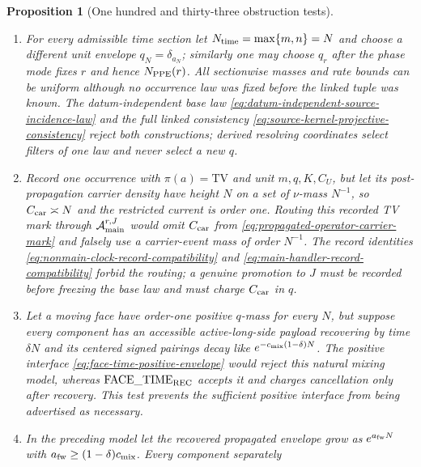 \documentclass[11pt]{article}
\newtheorem{proposition}[theorem]{Proposition}
\begin{document}
\begin{proposition}[One hundred and thirty-three obstruction tests]
\begin{enumerate}[label=\textup{(T\arabic*)}]
      upper moments do not prevent the normalized likelihood
      $W_\eta/\int W_\eta dK_\eta$ from having divergent $L^p$ norm.  The
      parentwise lower bound
      \eqref{eq:kernelwise-weight-normalization}, which is independent of the
      global tree normalization, rejects this rare-parent countermodel.
\item For every admissible time section let
      $N_{\rm time}=\max\{m,n\}=N$ and choose a different unit envelope
      $q_N=\delta_{a_N}$; similarly one may choose $q_r$ after the phase mode
      fixes $r$ and hence $N_{\rm PPE}(r)$.  All sectionwise masses and rate
      bounds can be uniform although no occurrence law was fixed before the
      linked tuple was known.  The datum-independent base law
      \eqref{eq:datum-independent-source-incidence-law} and the full linked
      consistency \eqref{eq:source-kernel-projective-consistency} reject
      both constructions; derived resolving coordinates select filters of
      one law and never select a new $q$.
\item Record one occurrence with $\pi(a)=\mathrm{TV}$ and unit
      $m,q,K,C_U$, but let its post-propagation carrier density have height
      $N$ on a set of $\nu$-mass $N^{-1}$, so $C_{\rm car}\asymp N$ and the
      restricted current is order one.  Routing this recorded TV mark through
      $\mathcal A_{\rm main}^{r,J}$ would omit $C_{\rm car}$ from
      \eqref{eq:propagated-operator-carrier-mark} and falsely use a
      carrier-event mass of order $N^{-1}$.  The record identities
      \eqref{eq:nonmain-clock-record-compatibility} and
      \eqref{eq:main-handler-record-compatibility} forbid the routing; a
      genuine promotion to $J$ must be recorded before freezing the base law
      and must charge $C_{\rm car}$ in $q$.
\item Let a moving face have order-one positive $q$-mass for every $N$, but
      suppose every component has an accessible active-long-side payload
      recovering by time $\delta N$ and its
      centered signed pairings decay like
      $e^{-c_{\rm mix}(1-\delta)N}$.  The positive interface
      \eqref{eq:face-time-positive-envelope} would reject this natural
      mixing model, whereas $\mathrm{FACE\_TIME}_{\rm REC}$ accepts it and
      charges cancellation only after recovery.  This test prevents the
      sufficient positive interface from being advertised as necessary.
\item In the preceding model let the recovered propagated envelope grow as
      $e^{a_{\rm fw}N}$ with
      $a_{\rm fw}\ge(1-\delta)c_{\rm mix}$.  Every component separately

\end{enumerate}
\end{proposition}
\end{document}
